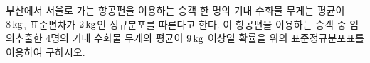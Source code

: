 \noindent\begin{minipage}[t]{0.58\linewidth}\vspace{0pt}\raggedright 부산에서 서울로 가는 항공편을 이용하는 승객 한 명의 기내 수화물 무게는 평균이 $8\mkern3mu \mathrm{kg}$, 표준편차가 $2\mkern3mu \mathrm{kg}$인 정규분포를 따른다고 한다. 이 항공편을 이용하는 승객 중 임의추출한 4명의 기내 수화물 무게의 평균이 $9\mkern3mu \mathrm{kg}$ 이상일 확률을 위의 표준정규분포표를 이용하여 구하시오.\end{minipage}\hfill\begin{minipage}[t]{0.4\linewidth}\vspace{0pt}\centering \resizebox{\ifdim\width>\linewidth\linewidth\else\width\fi}{!}{}\end{minipage}\par
